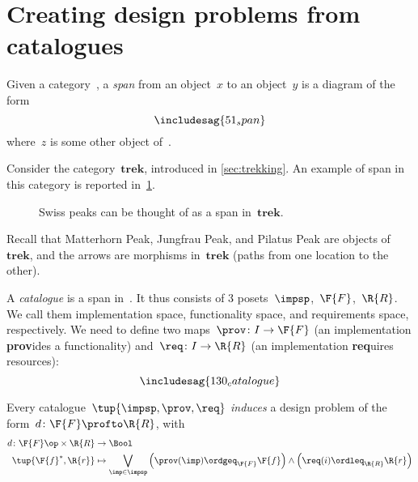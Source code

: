 
\section{Creating design problems from catalogues}
\begin{ctdefinition}[Span]
  Given a category~\CatC, a \emph{span} from an object~$x$ to an object~$y$ is a diagram of the form
  \begin{equation}
    \includesag{51_span}
  \end{equation}
  where~$z$ is some other object of~\CatC.
\end{ctdefinition}
\begin{example}
  Consider the category~$\mathbf{trek}$, introduced in \cref{sec:trekking}. An example of span in this category is reported in~\cref{fig:exmountains}.
  \begin{figure}[h!]
    \begin{center}
    \end{center}
    \caption{Swiss peaks can be thought of as a span in~$\mathbf{trek}$. \label{fig:exmountains}}
  \end{figure}
  Recall that \textsf{Matterhorn Peak}, \textsf{Jungfrau Peak}, and \textsf{Pilatus Peak} are objects of~$\mathbf{trek}$, and the arrows are morphisms in~$\mathbf{trek}$ (paths from one location to the other).
\end{example}

\begin{definition}[Catalogue]
  \label{def:catalogue}
  A \emph{catalogue} is a span in~\Pos.
  It thus consists of 3 posets~$\impsp$,~$\F{F}$,~$\R{R}$.
  We call them implementation space, functionality space, and requirements space, respectively. We need to define two maps~$\prov \colon I \to \F{F}$ (an implementation \textbf{prov}ides a functionality) and~$\req\colon I \to \R{R}$ (an implementation \textbf{req}uires resources):
  \begin{equation}
    \includesag{130_catalogue}
  \end{equation}
\end{definition}

\begin{definition}
  Every catalogue~$\tup{\impsp,\prov,\req}$ \emph{induces} a design problem of the form~$d\colon \F{F}\profto \R{R}$, with
  \begin{equation}
    \begin{aligned}
      d\colon \F{F}\op \times \R{R}&\to \Bool\\
      \tup{\F{f}^*,\R{r}}&\mapsto \bigvee_{\imp\in \impsp}\left(\prov(\imp)\ordgeq_{\F{F}}\F{f} \right)\wedge \left( \req(i)\ordleq_{\R{R}}\R{r}\right)
    \end{aligned}
  \end{equation}
\end{definition}

